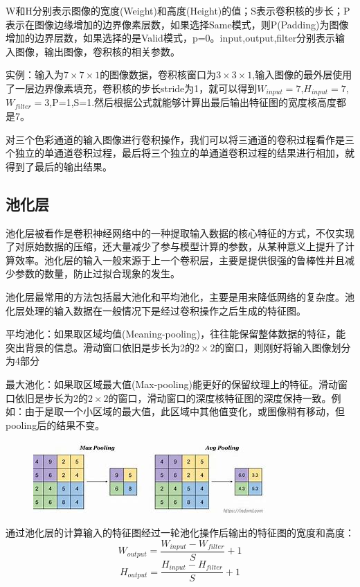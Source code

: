 \documentclass[openbib]{article}
\begin{document}
W和H分别表示图像的宽度(Weight)和高度(Height)的值；S表示卷积核的步长；P表示在图像边缘增加的边界像素层数，如果选择Same模式，则P(Padding)为图像增加的边界层数，如果选择的是Valid模式，p=0。input,output,filter分别表示输入图像，输出图像，卷积核的相关参数。

实例：输入为$7\times7\times1$的图像数据，卷积核窗口为$3\times3\times1$,输入图像的最外层使用了一层边界像素填充，卷积核的步长stride为1，就可以得到$W_{input}=7$,$H_{input}=7$,$W_{filter}=3$,P=1,S=1.然后根据公式就能够计算出最后输出特征图的宽度核高度都是7。

对三个色彩通道的输入图像进行卷积操作，我们可以将三通道的卷积过程看作是三个独立的单通道卷积过程，最后将三个独立的单通道卷积过程的结果进行相加，就得到了最后的输出结果。
\subsection{池化层}
池化层被看作是卷积神经网络中的一种提取输入数据的核心特征的方式，不仅实现了对原始数据的压缩，还大量减少了参与模型计算的参数，从某种意义上提升了计算效率。池化层的输入一般来源于上一个卷积层，主要是提供很强的鲁棒性并且减少参数的数量，防止过拟合现象的发生。

池化层最常用的方法包括最大池化和平均池化，主要是用来降低网络的复杂度。池化层处理的输入数据在一般情况下是经过卷积操作之后生成的特征图。

平均池化：如果取区域均值(Meaning-pooling)，往往能保留整体数据的特征，能突出背景的信息。滑动窗口依旧是步长为2的$2\times2$的窗口，则刚好将输入图像划分为4部分

最大池化：如果取区域最大值(Max-pooling)能更好的保留纹理上的特征。滑动窗口依旧是步长为2的$2\times2$的窗口，滑动窗口的深度核特征图的深度保持一致。例如：由于是取一个小区域的最大值，此区域中其他值变化，或图像稍有移动，但pooling后的结果不变。

\begin{figure}[htbp]
	\centering
	\includegraphics[scale=1]{4-4}
\end{figure}

通过池化层的计算输入的特征图经过一轮池化操作后输出的特征图的宽度和高度：
$$W_{output}=\frac{W_{input}-W_{filter}}{S}+1$$
$$H_{output}=\frac{H_{input}-H_{filter}}{S}+1$$
\end{document}
